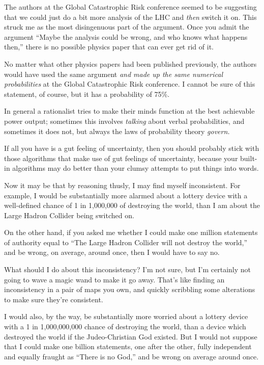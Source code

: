  The authors at the Global Catastrophic Risk conference seemed to
be suggesting that we could just do a bit more analysis of the LHC and
\textit{then} switch it on. This struck me as the most disingenuous
part of the argument. Once you admit the argument
``Maybe the analysis could be wrong, and who knows
what happens then,'' there is no possible physics
paper that can ever get rid of it.


 No matter what other physics papers had been published previously,
the authors would have used the same argument \textit{and made up the
same numerical probabilities} at the Global Catastrophic Risk
conference. I cannot be sure of this statement, of course, but it has a
probability of 75\%.


 In general a rationalist tries to make their minds function at the
best achievable power output; sometimes this involves \textit{talking}
about verbal probabilities, and sometimes it does not, but always the
laws of probability theory \textit{govern.}


 If all you have is a gut feeling of uncertainty, then you should
probably stick with those algorithms that make use of gut feelings of
uncertainty, because your built-in algorithms may do better than your
clumsy attempts to put things into words.


 Now it may be that by reasoning thusly, I may find myself
inconsistent. For example, I would be substantially more alarmed about
a lottery device with a well-defined chance of 1 in 1,000,000 of
destroying the world, than I am about the Large Hadron Collider being
switched on.


 On the other hand, if you asked me whether I could make one
million statements of authority equal to ``The Large
Hadron Collider will not destroy the world,'' and be
wrong, on average, around once, then I would have to say no.


 What should I do about this inconsistency? I'm not
sure, but I'm certainly not going to wave a magic wand
to make it go away. That's like finding an
inconsistency in a pair of maps you own, and quickly scribbling some
alterations to make sure they're consistent.


 I would also, by the way, be substantially more worried about a
lottery device with a 1 in 1,000,000,000 chance of destroying the
world, than a device which destroyed the world if the Judeo-Christian
God existed. But I would not suppose that I could make one billion
statements, one after the other, fully independent and equally fraught
as ``There is no God,'' and be wrong
on average around once.


